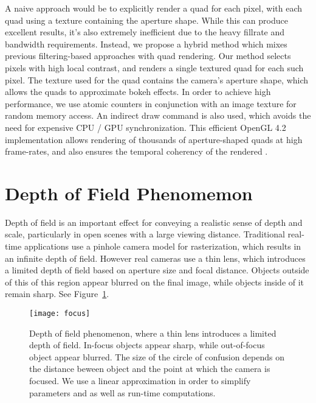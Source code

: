 A naive approach would be to explicitly render a quad for each pixel, with each quad using a texture containing the aperture shape. While this can produce excellent results, it's also extremely inefficient due to the heavy fillrate and bandwidth requirements. Instead, we propose a hybrid method which mixes previous filtering-based approaches with quad rendering. Our method selects pixels with high local contrast, and renders a single textured quad for each such pixel. The texture used for the quad contains the camera's aperture shape, which allows the quads to approximate bokeh effects. In order to achieve high performance, we use atomic counters in conjunction with an image texture for random memory access. An indirect draw command is also used, which avoids the need for expensive CPU / GPU synchronization. This efficient OpenGL 4.2 implementation allows rendering of thousands of aperture-shaped quads at high frame-rates, and also ensures the temporal coherency of the rendered \bokeh.

\section{Depth of Field Phenomemon}\label{Derousiers:DOFPhenomenon}
Depth of field is an important effect for conveying a realistic sense of depth and scale, particularly in open scenes with a large viewing distance. Traditional real-time applications use a pinhole camera model for rasterization, which results in an infinite depth of field. However real cameras use a thin lens, which introduces a limited depth of field based on aperture size and focal distance. Objects outside of this of this region appear blurred on the final image, while objects inside of it remain sharp. See Figure~\ref{Derousiers:focus}.

	\begin{figure}[htb]\centering
	\texttt{[image: focus]}
	\caption{Depth of field phenomenon, where a thin lens introduces a limited depth of field. In-focus objects appear sharp, while out-of-focus object appear blurred. The size of the circle of confusion depends on the distance beween object and the point at which the camera is focused. We use a linear approximation in order to simplify parameters and as well as run-time computations. }
	\label{Derousiers:focus}
	\end{figure}


